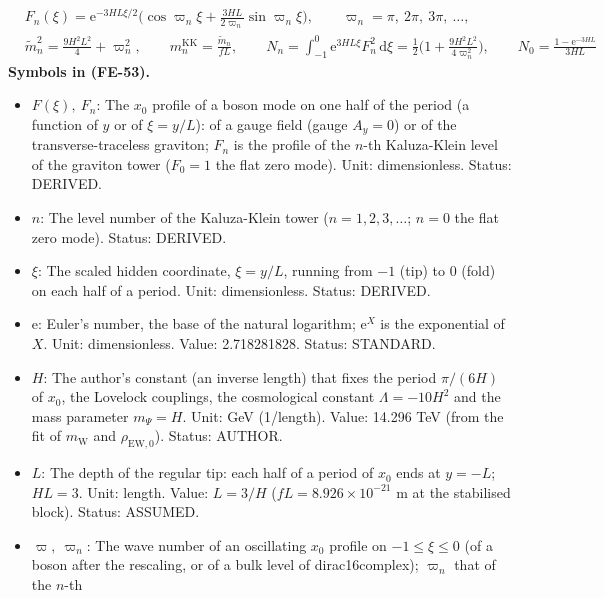 \documentclass[
  10pt,
]{article}
\providecommand{\tightlist}{%
  \setlength{\itemsep}{0pt}\setlength{\parskip}{0pt}}
\begin{document}
\[
\begin{aligned}
&F_n(\xi) = \mathrm{e}^{-3HL\xi/2}\Big(\cos\varpi_n\xi + \frac{3HL}{2\varpi_n}\sin\varpi_n\xi\Big),\qquad
 \varpi_n = \pi,\ 2\pi,\ 3\pi,\ \dots,\\
&\tilde m_n^2 = \frac{9H^2L^2}{4} + \varpi_n^2,\qquad m^{\mathrm{KK}}_n = \frac{\tilde m_n}{fL},\qquad
 N_n = \int_{-1}^{0}\mathrm{e}^{3HL\xi}F_n^2\,\mathrm{d}\xi = \frac12\Big(1 +
 \frac{9H^2L^2}{4\varpi_n^2}\Big),\qquad
 N_0 = \frac{1 - \mathrm{e}^{-3HL}}{3HL}
\end{aligned} \tag{FE-53}
\] \textbf{Symbols in (FE-53).}

\begin{itemize}
\tightlist
\item
  \(F(\xi),\ F_n\): The \(x_0\) profile of a boson mode on one half of
  the period (a function of \(y\) or of \(\xi = y/L\)): of a gauge field
  (gauge \(A_y = 0\)) or of the transverse-traceless graviton; \(F_n\)
  is the profile of the \(n\)-th Kaluza-Klein level of the graviton
  tower (\(F_0 = 1\) the flat zero mode). Unit: dimensionless. Status:
  DERIVED.
\item
  \(n\): The level number of the Kaluza-Klein tower
  (\(n = 1, 2, 3, \dots\); \(n = 0\) the flat zero mode). Status:
  DERIVED.
\item
  \(\xi\): The scaled hidden coordinate, \(\xi = y/L\), running from
  \(-1\) (tip) to \(0\) (fold) on each half of a period. Unit:
  dimensionless. Status: DERIVED.
\item
  \(\mathrm{e}\): Euler's number, the base of the natural logarithm;
  \(\mathrm{e}^{X}\) is the exponential of \(X\). Unit: dimensionless.
  Value: 2.718281828. Status: STANDARD.
\item
  \(H\): The author's constant (an inverse length) that fixes the period
  \(\pi/(6H)\) of \(x_0\), the Lovelock couplings, the cosmological
  constant \(\Lambda = -10H^2\) and the mass parameter \(m_\Psi = H\).
  Unit: GeV (1/length). Value: 14.296 TeV (from the fit of
  \(m_{\mathrm{W}}\) and \(\rho_{\mathrm{EW},0}\)). Status: AUTHOR.
\item
  \(L\): The depth of the regular tip: each half of a period of \(x_0\)
  ends at \(y = -L\); \(HL = 3\). Unit: length. Value: \(L = 3/H\)
  (\(fL = 8.926\times10^{-21}\) m at the stabilised block). Status:
  ASSUMED.
\item
  \(\varpi,\ \varpi_n\): The wave number of an oscillating \(x_0\)
  profile on \(-1 \le \xi \le 0\) (of a boson after the rescaling, or of
  a bulk level of dirac16complex); \(\varpi_n\) that of the \(n\)-th

\end{itemize}
\end{document}
